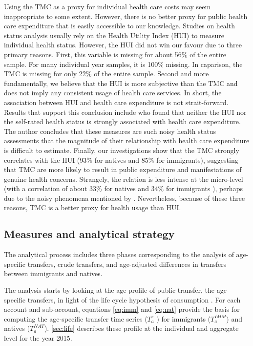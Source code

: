 \vspace{0.7em}\par
Using the TMC as a proxy for individual health care costs may seem inappropriate to some extent.
However, there is no better proxy for public health care expenditure that is easily accessible to our knowledge.
Studies on health status analysis usually rely on the Health Utility Index (HUI) to measure individual health status.
However, the HUI did not win our favour due to three primary reasons.
First, this variable is missing for about 56\% of the entire sample.
For many individual year samples, it is 100\% missing.
In caparison, the TMC is missing for only 22\% of the entire sample.
Second and more fundamentally, we believe that the HUI is more subjective than the TMC and does not imply any consistent usage of health care services.
In short, the association between HUI and health care expenditure is not strait-forward. Results that support this conclusion include \citet{Pierard:2016ik} who found that neither the HUI nor the self-rated health status is strongly associated with health care expenditure.
The author concludes that these measures are such noisy health status assessments that the magnitude of their relationship with health care expenditure is difficult to estimate.
Finally, our investigations show that the TMC strongly correlates with the HUI (93\% for natives and 85\% for immigrants), suggesting that TMC are more likely to result in public expenditure and manifestations of genuine health concerns.
Strangely, the relation is less intense at the micro-level (with a correlation of about 33\% for natives and 34\% for immigrants ), perhaps due to the noisy phenomena mentioned by \citet{Pierard:2016ik}.
Nevertheless, because of these three reasons, TMC is a better proxy for health usage than HUI.

\subsection{Measures and analytical strategy}

The analytical process includes three phases corresponding to the analysis of age-specific transfers, crude transfers, and age-adjusted differences in transfers between immigrants and natives.

\vspace{0.7em}\par
The analysis starts by looking at the age profile of public transfer, the age-specific transfers, in light of the life cycle hypothesis of consumption \citep{Ando:1963ea,Deaton:2005vr}.
For each account and sub-account, equations \eqref{eq:imm} and \eqref{eq:nat} provide the basis for computing the age-specific transfer time series (\( T^{r}_a \) ) for immigrants (\(T^{IMM}_a\)) and natives (\( T^{NAT}_a \)). \autoref{sec:life} describes these profile at the individual and aggregate level for the year 2015.

